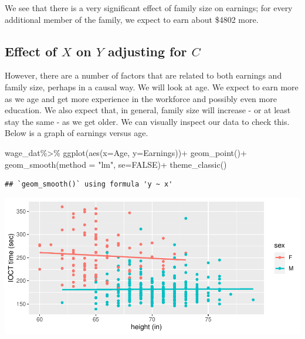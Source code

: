 \documentclass[
]{book}
\newenvironment{Shaded}{\begin{snugshade}}{\end{snugshade}}
\newcommand{\AttributeTok}[1]{\textcolor[rgb]{0.77,0.63,0.00}{#1}}
\newcommand{\ConstantTok}[1]{\textcolor[rgb]{0.00,0.00,0.00}{#1}}
\newcommand{\FunctionTok}[1]{\textcolor[rgb]{0.00,0.00,0.00}{#1}}
\newcommand{\NormalTok}[1]{#1}
\newcommand{\SpecialCharTok}[1]{\textcolor[rgb]{0.00,0.00,0.00}{#1}}
\newcommand{\StringTok}[1]{\textcolor[rgb]{0.31,0.60,0.02}{#1}}
\begin{document}
We see that there is a very significant effect of family size on earnings; for every additional member of the family, we expect to earn about \$4802 more.

\hypertarget{effect-of-x-on-y-adjusting-for-c-1}{%
\subsection{\texorpdfstring{Effect of \(X\) on \(Y\) adjusting for \(C\)}{Effect of X on Y adjusting for C}}\label{effect-of-x-on-y-adjusting-for-c-1}}

However, there are a number of factors that are related to both earnings and family size, perhaps in a causal way. We will look at age. We expect to earn more as we age and get more experience in the workforce and possibly even more education. We also expect that, in general, family size will increase - or at least stay the same - as we get older. We can visually inspect our data to check this. Below is a graph of earnings versus age.

\begin{Shaded}
\begin{Highlighting}[]
\NormalTok{wage\_dat}\SpecialCharTok{\%\textgreater{}\%}
  \FunctionTok{ggplot}\NormalTok{(}\FunctionTok{aes}\NormalTok{(}\AttributeTok{x=}\StringTok{\textasciigrave{}}\AttributeTok{Age}\StringTok{\textasciigrave{}}\NormalTok{,}
             \AttributeTok{y=}\StringTok{\textasciigrave{}}\AttributeTok{Earnings}\StringTok{\textasciigrave{}}\NormalTok{))}\SpecialCharTok{+}
  \FunctionTok{geom\_point}\NormalTok{()}\SpecialCharTok{+}
  \FunctionTok{geom\_smooth}\NormalTok{(}\AttributeTok{method =} \StringTok{"lm"}\NormalTok{, }\AttributeTok{se=}\ConstantTok{FALSE}\NormalTok{)}\SpecialCharTok{+}
  \FunctionTok{theme\_classic}\NormalTok{()}
\end{Highlighting}
\end{Shaded}

\begin{verbatim}
## `geom_smooth()` using formula 'y ~ x'
\end{verbatim}

\includegraphics{MA206supplement_files/figure-latex/unnamed-chunk-18-1.pdf}
\end{document}
